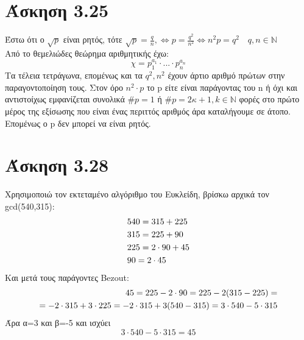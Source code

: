\documentclass[12pt]{article}
\numberwithin{equation}{section}
\begin{document}
\section{Άσκηση 3.25}
Έστω ότι ο $\sqrt{p}$ είναι ρητός, τότε \(\sqrt{p} = \frac{q}{n}, \iff p = \frac{q^2}{n^2} \iff n^2p = q^2 \quad q,n \in \mathbb{N}\) \\
Από το θεμελιώδες θεώρημα αριθμητικής έχω:
$$
χ = p_1^{a_1}\cdot...\cdot p_n^{a_n}
$$
Τα τέλεια τετράγωνα, επομένως και τα $q^2,n^2$ έχουν άρτιο αριθμό πρώτων στην παραγοντοποίηση τους. Στον όρο $n^2 \cdot p$ το p είτε είναι παράγοντας του n ή όχι και αντιστοίχως εμφανίζεται συνολικά \(\#p=1\) ή \(\#p=2κ+1,  k \in \mathbb{N}\) φορές στο πρώτο μέρος της εξίσωσης που είναι ένας περιττός αριθμός άρα καταλήγουμε σε άτοπο. Επομένως ο p δεν μπορεί να είναι ρητός.

\section{Άσκηση 3.28}
Χρησιμοποιώ τον εκτεταμένο αλγόριθμο του Ευκλείδη, βρίσκω αρχικά τον gcd(540,315):
\begin{align*}
&540 = 315 + 225 \notag \\
&315 = 225 + 90 \notag \\
&225 = 2\cdot90 + 45 \notag \\
&90 = 2\cdot45 \notag 
\end{align*}
Και μετά τους παράγοντες Bezout:
\begin{align*}
45 = 225 - 2\cdot90 = 225 - 2(315 - 225) = \notag \\
= -2\cdot315 + 3\cdot225 = -2\cdot315 + 3(540 - 315) = 3\cdot540 -5\cdot315 \notag
\end{align*}
Άρα α=3 και β=-5 και ισχύει $$3\cdot540 -5\cdot315 = 45$$
\end{document}
